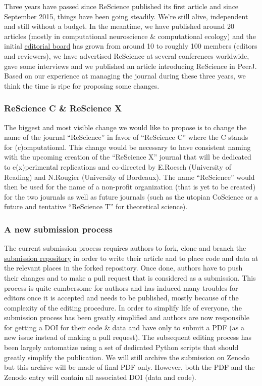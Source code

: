 
Three years have passed since ReScience published its first
article\supercite{Topalidou:2015} and since September 2015, things have been
going steadily. We're still alive, independent and still without a budget. In
the meantime, we have published around 20 articles (mostly in computational
neuroscience \& computational ecology) and the initial
\href{https://rescience.github.io/board/}{editorial board} has grown from
around 10 to roughly 100 members (editors and reviewers), we have advertised
ReScience at several conferences worldwide, gave some
interviews\supercite{Science:2018} and we published an article introducing
ReScience in PeerJ\supercite{Rougier:2017}. Based on our
experience\supercite{Rougier:2018} at managing the journal during these three
years, we think the time is ripe for proposing some changes.

\subsubsection{ReScience C \& ReScience X}

The biggest and most visible change we would like to propose is to change the
name of the journal ``ReScience'' in favor of ``ReScience C'' where the C
stands for (c)omputational. This change would be necessary to have consistent
naming with the upcoming creation of the ``ReScience X'' journal that will be
dedicated to e(x)perimental replications and co-directed by E.Roesch
(University of Reading) and N.Rougier (University of Bordeaux). The name
``ReScience'' would then be used for the name of a non-profit organization
(that is yet to be created) for the two journals as well as future journals
(such as the utopian CoScience\supercite{Rougier:2017} or a future and
tentative ``ReScience T'' for theoretical science).


\subsubsection{A new submission process}

The current submission process requires authors to fork, clone and branch the
\href{https://github.com/ReScience/ReScience-submission}{submission repository}
in order to write their article and to place code and data at the relevant
places in the forked repository. Once done, authors have to push their changes
and to make a pull request that is considered as a submission. This process is
quite cumbersome for authors and has induced many troubles for editors once it
is accepted and needs to be published, mostly because of the complexity of the
editing procedure. In order to simplify life of everyone, the submission
process has been greatly simplified and authors are now responsible for getting
a DOI for their code \& data and have only to submit a PDF (as a new issue
instead of making a pull request). The subsequent editing process has been
largely automatize using a set of dedicated Python scripts that should greatly
simplify the publication. We will still archive the submission on Zenodo but
this archive will be made of final PDF only. However, both the PDF and the
Zenodo entry will contain all associated DOI (data and code).


